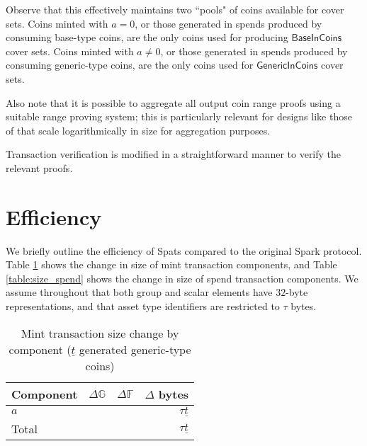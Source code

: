 \documentclass{article}
\newcommand{\G}{\mathbb{G}}
\newcommand{\F}{\mathbb{F}}
\newcommand{\func}[1]{\mathsf{#1}}
\begin{document}
Observe that this effectively maintains two ``pools" of coins available for cover sets.
Coins minted with $a = 0$, or those generated in spends produced by consuming base-type coins, are the only coins used for producing $\func{BaseInCoins}$ cover sets.
Coins minted with $a \neq 0$, or those generated in spends produced by consuming generic-type coins, are the only coins used for $\func{GenericInCoins}$ cover sets.

Also note that it is possible to aggregate all output coin range proofs using a suitable range proving system; this is particularly relevant for designs like those of \cite{bp,bp_plus} that scale logarithmically in size for aggregation purposes.

Transaction verification is modified in a straightforward manner to verify the relevant proofs.


\section{Efficiency}

We briefly outline the efficiency of Spats compared to the original Spark protocol.
Table \ref{table:size_mint} shows the change in size of mint transaction components, and Table \ref{table:size_spend} shows the change in size of spend transaction components.
We assume throughout that both group and scalar elements have $32$-byte representations, and that asset type identifiers are restricted to $\tau$ bytes.

\begin{table}[ht]
    \centering
    \begin{tabular}{|l|r|r|r|}
    \hline
    \textbf{Component} & \textbf{$\Delta\G$} & \textbf{$\Delta\F$} & \textbf{$\Delta$ bytes} \\
    \hline
    $a$ & &  & $\tau\underline{t}$ \\
    \hline
    Total & & & $\tau\underline{t}$ \\
    \hline
    \end{tabular}
    \caption{Mint transaction size change by component ($\underline{t}$ generated generic-type coins)}
    \label{table:size_mint}
\end{table}
\end{document}
